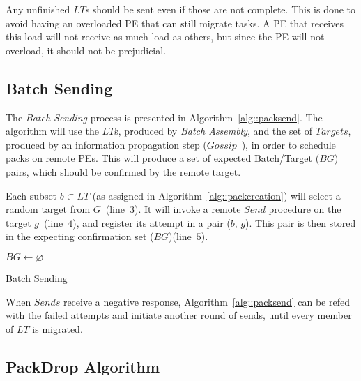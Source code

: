Any unfinished $LT$s should be sent even if those are not complete.
This is done to avoid having an overloaded PE that can still migrate tasks.
A PE that receives this load will not receive as much load as others, but since the PE will not overload, it should not be prejudicial.

\subsection{Batch Sending} \label{sec:algo:sending}

The \textit{Batch Sending} process is presented in Algorithm~\ref{alg::packsend}.
The algorithm will use the $LT$s, produced by \textit{Batch Assembly}, and the set of $Targets$, produced by an information propagation step ($Gossip$~\cite{gossip}), in order to schedule packs on remote PEs.
This will produce a set of expected Batch/Target ($BG$) pairs, which should be confirmed by the remote target.

Each subset $b \subset LT$ (as assigned in Algorithm~\ref{alg::packcreation}) will select a random target from $G$~(line~$3$).
It will invoke a remote $Send$ procedure on the target $g$~(line~$4$), and register its attempt in a pair ($b$, $g$).
This pair is then stored in the expecting confirmation set ($BG$)(line~$5$).


\begin{algorithm}[!ht]
    \DontPrintSemicolon
    $BG \gets \varnothing$ \\
    \caption{Batch Sending}  
    \label{alg::packsend}
\end{algorithm}

When $Sends$ receive a negative response, Algorithm~\ref{alg::packsend} can be refed with the failed attempts and initiate another round of sends, until every member of $LT$ is migrated.

\subsection{PackDrop Algorithm} \label{sec:algo:main}

